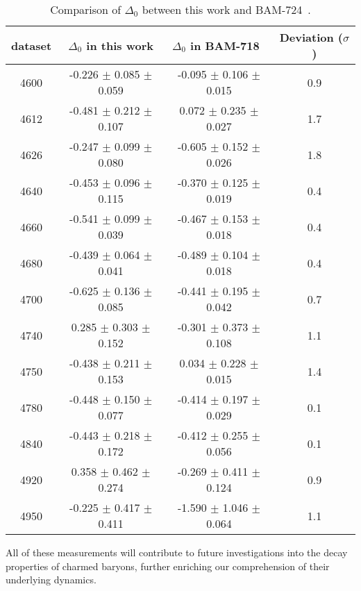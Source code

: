 \begin{table}[H]
    \centering
    \caption{Comparison of $\Delta_0$ between this work and BAM-724~\cite{ESIIImemo:LcDecayAsy}. }
    \label{tab:delta0-compare}
    \begin{tabular}{cccc}
    \hline\hline
dataset & $\Delta_0$ in this work & $\Delta_0$ in BAM-718~\cite{ESIIImemo:LcDecayAsy} & Deviation ($\sigma$)\\\hline
4600 & -0.226 $\pm$ 0.085 $\pm$ 0.059 & -0.095 $\pm$ 0.106 $\pm$ 0.015 & 0.9\\
4612 & -0.481 $\pm$ 0.212 $\pm$ 0.107 & 0.072 $\pm$ 0.235 $\pm$ 0.027 & 1.7\\
4626 & -0.247 $\pm$ 0.099 $\pm$ 0.080 & -0.605 $\pm$ 0.152 $\pm$ 0.026 & 1.8\\
4640 & -0.453 $\pm$ 0.096 $\pm$ 0.115 & -0.370 $\pm$ 0.125 $\pm$ 0.019 & 0.4\\
4660 & -0.541 $\pm$ 0.099 $\pm$ 0.039 & -0.467 $\pm$ 0.153 $\pm$ 0.018 & 0.4\\
4680 & -0.439 $\pm$ 0.064 $\pm$ 0.041 & -0.489 $\pm$ 0.104 $\pm$ 0.018 & 0.4\\
4700 & -0.625 $\pm$ 0.136 $\pm$ 0.085 & -0.441 $\pm$ 0.195 $\pm$ 0.042 & 0.7\\
4740 & 0.285 $\pm$ 0.303 $\pm$ 0.152 & -0.301 $\pm$ 0.373 $\pm$ 0.108 & 1.1\\
4750 & -0.438 $\pm$ 0.211 $\pm$ 0.153 & 0.034 $\pm$ 0.228 $\pm$ 0.015 & 1.4\\
4780 & -0.448 $\pm$ 0.150 $\pm$ 0.077 & -0.414 $\pm$ 0.197 $\pm$ 0.029 & 0.1\\
4840 & -0.443 $\pm$ 0.218 $\pm$ 0.172 & -0.412 $\pm$ 0.255 $\pm$ 0.056 & 0.1\\
4920 & 0.358 $\pm$ 0.462 $\pm$ 0.274 & -0.269 $\pm$ 0.411 $\pm$ 0.124 & 0.9\\
4950 & -0.225 $\pm$ 0.417 $\pm$ 0.411 & -1.590 $\pm$ 1.046 $\pm$ 0.064 & 1.1\\
\hline\hline
    \end{tabular}
\end{table}

All of these measurements will contribute to future investigations into the decay properties of charmed baryons, further enriching our comprehension of their underlying dynamics.


